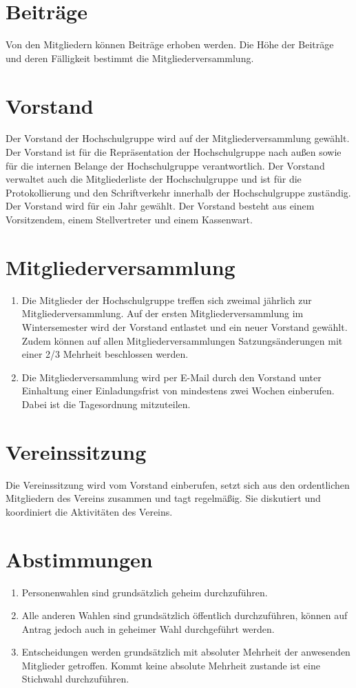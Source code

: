 \documentclass[a4paper]{scrartcl}
\begin{document}
\section{Beiträge}
Von den Mitgliedern können Beiträge erhoben werden. Die Höhe der Beiträge und
deren Fälligkeit bestimmt die Mitgliederversammlung.

\section{Vorstand}
Der Vorstand der Hochschulgruppe wird auf der Mitgliederversammlung gewählt.
Der Vorstand ist für die Repräsentation der Hochschulgruppe nach außen sowie
für die internen Belange der Hochschulgruppe verantwortlich. Der Vorstand
verwaltet auch die Mitgliederliste der Hochschulgruppe und ist für die
Protokollierung und den Schriftverkehr innerhalb der Hochschulgruppe zuständig.
Der Vorstand wird für ein Jahr gewählt. Der Vorstand besteht aus einem
Vorsitzendem, einem Stellvertreter und einem Kassenwart.

\section{Mitgliederversammlung}
\begin{enumerate}
    \item Die Mitglieder der Hochschulgruppe treffen sich zweimal jährlich zur
          Mitgliederversammlung. Auf der ersten Mitgliederversammlung im
          Wintersemester wird der Vorstand entlastet und ein neuer Vorstand
          gewählt. Zudem können auf allen Mitgliederversammlungen
          Satzungsänderungen mit einer 2/3 Mehrheit beschlossen werden.
    \item Die Mitgliederversammlung wird per E-Mail durch den Vorstand unter
          Einhaltung einer Einladungsfrist von mindestens zwei Wochen
          einberufen. Dabei ist die Tagesordnung mitzuteilen.
\end{enumerate}

\section{Vereinssitzung}
Die Vereinssitzung wird vom Vorstand einberufen, setzt sich aus den
ordentlichen Mitgliedern des Vereins zusammen und tagt regelmäßig. Sie
diskutiert und koordiniert die Aktivitäten des Vereins.

\section{Abstimmungen}
\begin{enumerate}
    \item Personenwahlen sind grundsätzlich geheim durchzuführen.
    \item Alle anderen Wahlen sind grundsätzlich öffentlich durchzuführen,
          können auf Antrag jedoch auch in geheimer Wahl durchgeführt werden.
    \item Entscheidungen werden grundsätzlich mit absoluter Mehrheit der
          anwesenden Mitglieder getroffen. Kommt keine absolute Mehrheit
          zustande ist eine Stichwahl durchzuführen.
\end{enumerate}
\end{document}
